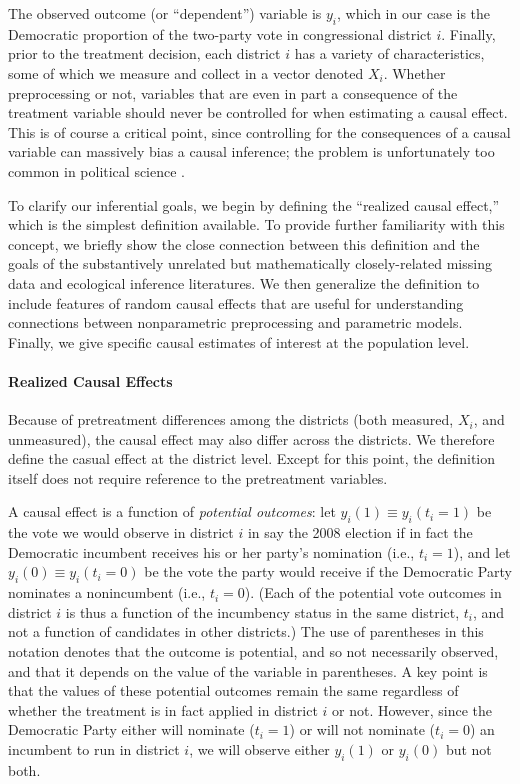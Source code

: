 \documentclass[11pt,titlepage]{article}
\begin{document}
The observed outcome (or ``dependent'') variable is $y_i$, which in
our case is the Democratic proportion of the two-party vote in
congressional district $i$.  Finally, prior to the treatment decision,
each district $i$ has a variety of characteristics, some of which we
measure and collect in a vector denoted $X_i$.  Whether preprocessing
or not, variables that are even in part a consequence of the treatment
variable should never be controlled for when estimating a causal
effect.  This is of course a critical point, since controlling for the
consequences of a causal variable can massively bias a causal
inference; the problem is unfortunately too common in political
science \citep{KinZen04}.

To clarify our inferential goals, we begin by defining the ``realized
causal effect,'' which is the simplest definition available.  To
provide further familiarity with this concept, we briefly show the
close connection between this definition and the goals of the
substantively unrelated but mathematically closely-related missing
data and ecological inference literatures.  We then generalize the
definition to include features of random causal effects that are
useful for understanding connections between nonparametric
preprocessing and parametric models.  Finally, we give specific causal
estimates of interest at the population level.

\paragraph{Realized Causal Effects}
Because of pretreatment differences among the districts (both
measured, $X_i$, and unmeasured), the causal effect may also differ
across the districts.  We therefore define the casual effect at the
district level.  Except for this point, the definition itself does not
require reference to the pretreatment variables.

A causal effect is a function of \emph{potential outcomes}: let
$y_i(1)\equiv y_i(t_i=1)$ be the vote we would observe in district $i$
in say the 2008 election if in fact the Democratic incumbent receives
his or her party's nomination (i.e., $t_i=1$), and let $y_i(0)\equiv
y_i(t_i=0)$ be the vote the party would receive if the Democratic
Party nominates a nonincumbent (i.e., $t_i=0$).  (Each of the
potential vote outcomes in district $i$ is thus a function of the
incumbency status in the same district, $t_i$, and not a function of
candidates in other districts.)  The use of parentheses in this
notation denotes that the outcome is potential, and so not necessarily
observed, and that it depends on the value of the variable in
parentheses.  A key point is that the values of these potential
outcomes remain the same regardless of whether the treatment is in
fact applied in district $i$ or not.  However, since the Democratic
Party either will nominate ($t_i=1$) or will not nominate ($t_i=0$) an
incumbent to run in district $i$, we will observe either $y_{i}(1)$ or
$y_{i}(0)$ but not both.
\end{document}
